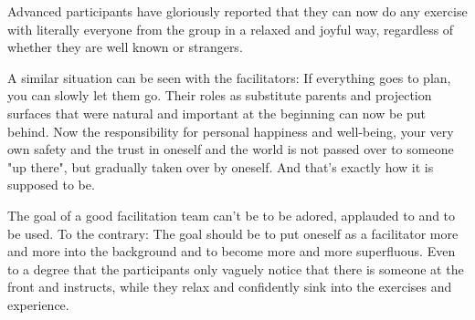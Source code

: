 Advanced participants have gloriously reported that they can now do any exercise with literally everyone from the group in a relaxed and joyful way, regardless of whether they are well known or strangers.

A similar situation can be seen with the facilitators: If everything goes to plan, you can slowly let them go. Their roles as substitute parents and projection surfaces that were natural and important at the beginning can now be put behind. Now the responsibility for personal happiness and well-being, your very own safety and the trust in oneself and the world is not passed over to someone "up there", but gradually taken over by oneself. And that's exactly how it is supposed to be.

The goal of a good facilitation team can't be to be adored, applauded to and to be used. To the contrary: The goal should be to put oneself as a facilitator more and more into the background and to become more and more superfluous. Even to a degree  that the participants only vaguely notice that there is someone at the front and instructs, while they relax and confidently sink into the exercises and experience.
